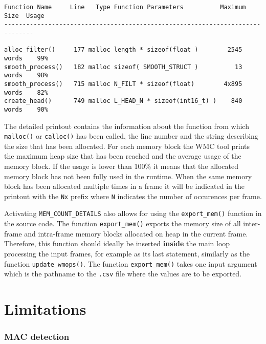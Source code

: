 \begin{Verbatim}[fontsize=\small]
Function Name     Line   Type Function Parameters          Maximum Size  Usage
------------------------------------------------------------------------------

alloc_filter()     177 malloc length * sizeof(float )        2545 words    99%
smooth_process()   182 malloc sizeof( SMOOTH_STRUCT )          13 words    98%
smooth_process()   715 malloc N_FILT * sizeof(float)        4x895 words    82%
create_head()      749 malloc L_HEAD_N * sizeof(int16_t) )    840 words    90%
\end{Verbatim}

The detailed printout contains the information about the function from which \verb|malloc()| or \verb|calloc()| has been called, the line number and the string describing the size that has been allocated. For each memory block the WMC tool prints the maximum heap size that has been reached and the average usage of the memory block. If the usage is lower than 100\% it means that the allocated memory block has not been fully used in the runtime. When the same memory block has been allocated multiple times in a frame it will be indicated in the printout with the \verb|Nx| prefix where \verb|N| indicates the number of occurences per frame.

Activating \verb|MEM_COUNT_DETAILS| also allows for using the \verb|export_mem()| function in the source code. The function \verb|export_mem()| exports the memory size of all inter-frame and intra-frame memory blocks allocated on heap in the current frame. Therefore, this function should ideally be inserted \textbf{inside} the main loop processing the input frames, for example as its last statement, similarly as the function \verb|update_wmops()|. The function \verb|export_mem()| takes one input argument which is the pathname to the \verb|.csv| file where the values are to be exported.


\section{Limitations}
\label{ch:limitations}

\subsubsection{MAC detection}

